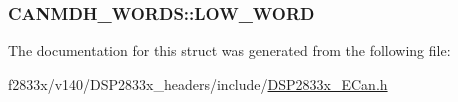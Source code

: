 \subsubsection[{L\+O\+W\+\_\+\+W\+O\+R\+D}]{ C\+A\+N\+M\+D\+H\+\_\+\+W\+O\+R\+D\+S\+::\+L\+O\+W\+\_\+\+W\+O\+R\+D}\label{struct_c_a_n_m_d_h___w_o_r_d_s_a6dd716ecdc1b8b9bc4c4d6b4353196a4}


The documentation for this struct was generated from the following file\+:\begin{DoxyCompactItemize}
\item 
f2833x/v140/\+D\+S\+P2833x\+\_\+headers/include/\hyperlink{_d_s_p2833x___e_can_8h}{D\+S\+P2833x\+\_\+\+E\+Can.\+h}\end{DoxyCompactItemize}
